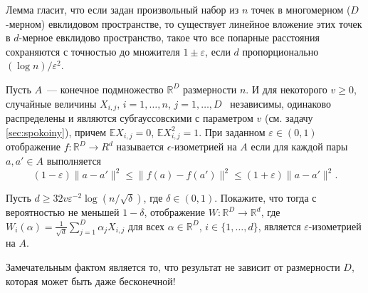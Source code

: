 \begin{problem}
Лемма гласит, что если задан произвольный набор из $n$ точек в многомерном ($D$-мерном) евклидовом пространстве, то существует линейное вложение этих точек в $d$-мерное евклидово пространство, такое что все попарные расстояния сохраняются с точностью до множителя $1\pm\varepsilon$, если $d$ пропорционально $(\log n)/\varepsilon^2$. 

Пусть $A$~--- конечное подмножество $\mathbb{R}^D$ размерности $n$. И для  некоторого $v\geq 0$, случайные величины  $X_{i,j}$, $i=1,\dots,n$, $j=1,\dots,D$~ независимы, одинаково распределены и являются субгауссовскими с параметром $v$ (см. задачу \ref{sec:spokoiny}), причем $\mathbb{E}X_{i,j}=0$, $\mathbb{E}X^2_{i,j}=1$.
При заданном $\varepsilon\in(0,1)$ отображение $f:\mathbb{R}^D\to R^{d}$ называется $\epsilon$-изометрией на $A$ если для каждой пары $a,a'\in A$ выполняется 
$$
(1-\varepsilon)\|a-a'\|^2\leq \|f(a)-f(a')\|^2\leq (1+\varepsilon)\|a-a'\|^2.
$$

Пусть $d\geq 32v\varepsilon^{-2}\log(n/\sqrt{\delta})$, где $\delta\in(0,1)$. Покажите, что тогда с вероятностью не меньшей $1-\delta$, отображение $W: \mathbb{R}^D\to \mathbb{R}^d$, где $W_i(\alpha) =  \frac{1}{\sqrt{d}}\sum_{j=1}^D \alpha_j X_{i,j}$ для всех $\alpha\in \mathbb{R}^D$, $i\in\{1,\dots,d\}$, является $\varepsilon$-изометрией на $A$.
\end{problem}
\begin{remark}
Замечательным фактом является то, что результат не зависит от размерности $D$, которая может быть даже бесконечной!
\end{remark}
